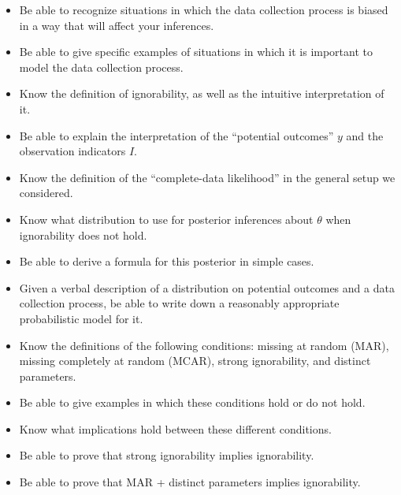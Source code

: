 \documentclass[12pt]{article}
\begin{document}
\begin{itemize}
\item Be able to recognize situations in which the data collection process is biased in a way that will affect your inferences.
\item Be able to give specific examples of situations in which it is important to model the data collection process.
\item Know the definition of ignorability, as well as the intuitive interpretation of it.
\item Be able to explain the interpretation of the ``potential outcomes'' $y$ and the observation indicators $I$.
\item Know the definition of the ``complete-data likelihood'' in the general setup we considered.
\item Know what distribution to use for posterior inferences about $\theta$ when ignorability does not hold.
\item Be able to derive a formula for this posterior in simple cases.
\item Given a verbal description of a distribution on potential outcomes and a data collection process, be able to write down a reasonably appropriate probabilistic model for it.
\item Know the definitions of the following conditions: missing at random (MAR), missing completely at random (MCAR), strong ignorability, and distinct parameters.
\item Be able to give examples in which these conditions hold or do not hold.
\item Know what implications hold between these different conditions.
\item Be able to prove that strong ignorability implies ignorability.
\item Be able to prove that MAR + distinct parameters implies ignorability.
\end{itemize}


  
\end{document}
